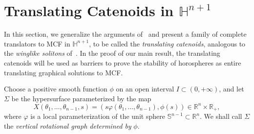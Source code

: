 \documentclass{amsart}[12pt]
\newcommand{\hn}[1]{\h^{#1}}
\theoremstyle{definition}
\theoremstyle{plain}
\newcommand{\R}{\mathbb{R} }
\newcommand{\h}{\mathbb{H} }
\newcommand{\s}{\mathbb{S}}
\renewcommand{\Sigma}{\varSigma}
\begin{document}
\section{Translating Catenoids in $\h^{n+1}$} \label{sec-translators}

In this section, we generalize the arguments of~\cite{dLRS} and
present a family of complete translators to MCF in $\hn{n+1}$,
to be called the {\em translating catenoids},
analogous to the {\em winglike solitons} of~\cite{schulze}. In
the proof of our main result, the translating catenoids will be used
as barriers to prove the stability of horospheres
as entire translating graphical solutions to MCF.


Choose a positive smooth function $\phi$ on an open interval
$I\subset(0,+\infty)$, and let $\Sigma$ be the hypersurface parameterized by the map
\begin{equation} \label{eq-parameterization}
X(\theta_1,\dots, \theta_{n-1},s)=
(s\varphi(\theta_1,\dots,\theta_{n-1}),\phi(s))\in\R^{n}\times\R_+,
\end{equation}
where $\varphi$ is a local parameterization of the unit sphere $\s^{n-1}\subset\R^n$.
We shall call $\Sigma$ the \emph{vertical rotational graph determined by} $\phi$.
\end{document}
